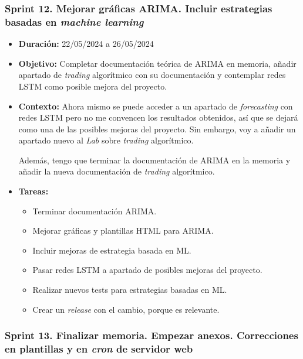 \subsubsection{Sprint 12. Mejorar gráficas ARIMA. Incluir estrategias basadas en \emph{machine learning}}


\begin{itemize}
\item  
\textbf{Duración:} 22/05/2024 a 26/05/2024

\item
\textbf{Objetivo:} Completar documentación teórica de ARIMA en memoria, añadir apartado de \emph{trading} algorítmico con su documentación y contemplar redes LSTM como posible mejora del proyecto. 


\item
\textbf{Contexto:} Ahora mismo se puede acceder a un apartado de \emph{forecasting} con redes LSTM pero no me convencen los resultados obtenidos, así que se dejará como una de las posibles mejoras del proyecto. Sin embargo, voy a añadir un apartado nuevo al \emph{Lab} sobre \emph{trading} algorítmico. 

Además, tengo que terminar la documentación de ARIMA en la memoria y añadir la nueva documentación de \emph{trading} algorítmico. 


\item
\textbf{Tareas:}
	\begin{itemize}
	\tightlist
	\item 
	Terminar documentación ARIMA. 
	\item
	Mejorar gráficas y plantillas HTML para ARIMA.  
	\item
	Incluir mejoras de estrategia basada en ML. 
	\item
	Pasar redes LSTM a apartado de posibles mejoras del proyecto. 
	\item
	Realizar nuevos tests para estrategias basadas en ML.
	\item
	Crear un \emph{release} con el cambio, porque es relevante. 
  	\end{itemize}
\end{itemize}



\subsubsection{Sprint 13. Finalizar memoria. Empezar anexos. Correcciones en plantillas y en \emph{cron} de servidor web}

